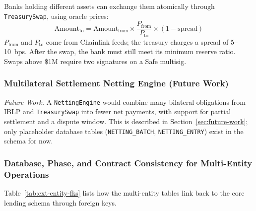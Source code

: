 \documentclass[12pt,a4paper]{report}
\begin{document}
Banks holding different assets can exchange them atomically through \texttt{TreasurySwap}, using oracle prices:
\begin{equation}
\text{Amount}_{\text{to}} = \text{Amount}_{\text{from}} \times \frac{P_{\text{from}}}{P_{\text{to}}} \times (1 - \text{spread})
\end{equation}
\noindent $P_{\text{from}}$ and $P_{\text{to}}$ come from Chainlink feeds; the treasury charges a spread of 5--10~bps. After the swap, the bank must still meet its minimum reserve ratio. Swaps above \$1M require two signatures on a Safe multisig.

\subsubsection{Multilateral Settlement Netting Engine (Future Work)}
\label{sec:netting-settlement}

\noindent\textit{Future Work.} A \texttt{NettingEngine} would combine many bilateral obligations from IBLP and \texttt{TreasurySwap} into fewer net payments, with support for partial settlement and a dispute window. This is described in Section~\ref{sec:future-work}; only placeholder database tables (\texttt{NETTING\_BATCH}, \texttt{NETTING\_ENTRY}) exist in the schema for now.

\subsubsection{Database, Phase, and Contract Consistency for Multi-Entity Operations}
\label{sec:multi-entity-consistency}

Table~\ref{tab:ext-entity-fks} lists how the multi-entity tables link back to the core lending schema through foreign keys.
\end{document}
